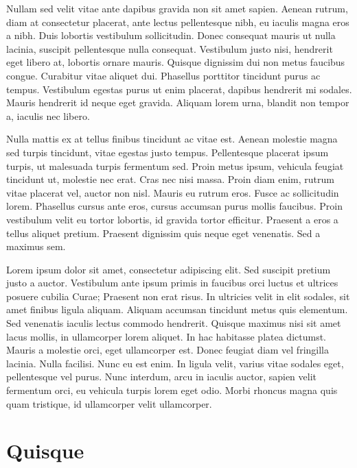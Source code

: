 Nullam sed velit vitae ante dapibus gravida non sit amet sapien. Aenean rutrum, diam at consectetur placerat, ante lectus pellentesque nibh, eu iaculis magna eros a nibh. Duis lobortis vestibulum sollicitudin. Donec consequat mauris ut nulla lacinia, suscipit pellentesque nulla consequat. Vestibulum justo nisi, hendrerit eget libero at, lobortis ornare mauris. Quisque dignissim dui non metus faucibus congue. Curabitur vitae aliquet dui. Phasellus porttitor tincidunt purus ac tempus. Vestibulum egestas purus ut enim placerat, dapibus hendrerit mi sodales. Mauris hendrerit id neque eget gravida. Aliquam lorem urna, blandit non tempor a, iaculis nec libero.

Nulla mattis ex at tellus finibus tincidunt ac vitae est. Aenean molestie magna sed turpis tincidunt, vitae egestas justo tempus. Pellentesque placerat ipsum turpis, ut malesuada turpis fermentum sed. Proin metus ipsum, vehicula feugiat tincidunt ut, molestie nec erat. Cras nec nisi massa. Proin diam enim, rutrum vitae placerat vel, auctor non nisl. Mauris eu rutrum eros. Fusce ac sollicitudin lorem. Phasellus cursus ante eros, cursus accumsan purus mollis faucibus. Proin vestibulum velit eu tortor lobortis, id gravida tortor efficitur. Praesent a eros a tellus aliquet pretium. Praesent dignissim quis neque eget venenatis. Sed a maximus sem.


Lorem ipsum dolor sit amet, consectetur adipiscing elit. Sed suscipit pretium justo a auctor. Vestibulum ante ipsum primis in faucibus orci luctus et ultrices posuere cubilia Curae; Praesent non erat risus. In ultricies velit in elit sodales, sit amet finibus ligula aliquam. Aliquam accumsan tincidunt metus quis elementum. Sed venenatis iaculis lectus commodo hendrerit. Quisque maximus nisi sit amet lacus mollis, in ullamcorper lorem aliquet. In hac habitasse platea dictumst. Mauris a molestie orci, eget ullamcorper est. Donec feugiat diam vel fringilla lacinia. Nulla facilisi. Nunc eu est enim. In ligula velit, varius vitae sodales eget, pellentesque vel purus. Nunc interdum, arcu in iaculis auctor, sapien velit fermentum orci, eu vehicula turpis lorem eget odio. Morbi rhoncus magna quis quam tristique, id ullamcorper velit ullamcorper.

\section{Quisque}

